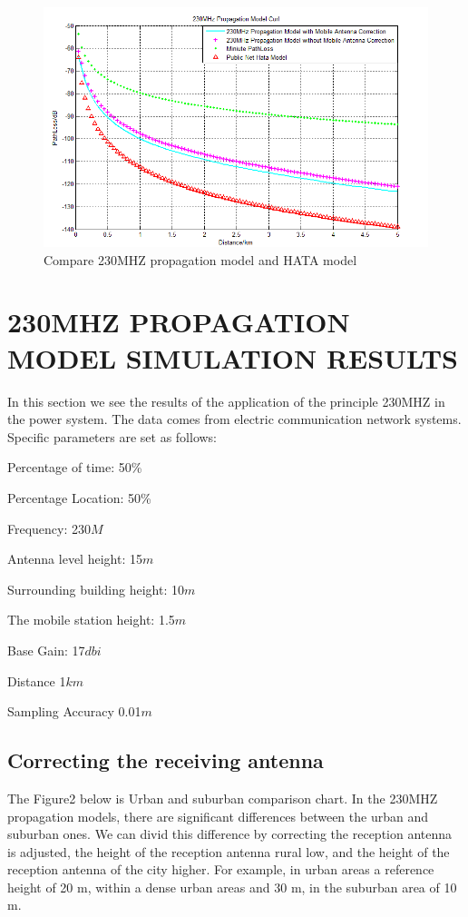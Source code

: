 \documentclass[runningheads,a4paper]{llncs}
\begin{document}
{\begin{figure}
\centerline{\includegraphics[width=15cm]{differentspace.png}}
\caption{Compare 230MHZ propagation model and HATA model }
\end{figure}

\section{230MHZ PROPAGATION MODEL SIMULATION RESULTS}

In this section we see the results of the application of the principle 230MHZ in the power system. The data comes from electric communication network systems. Specific parameters are set as follows:

Percentage of time: 50\% 

Percentage Location: 50\% 

Frequency: 230$M$ 

Antenna level height: 15$m$ 

Surrounding building height: 10$m$ 

The mobile station height: 1.5$m$ 

Base Gain: 17$dbi$ 

Distance 1$km$ 

Sampling Accuracy 0.01$m$

\subsection{Correcting the receiving antenna}

The Figure2 below is Urban and suburban comparison chart. In the 230MHZ propagation models, there are significant differences between the urban and suburban ones.  We can divid this difference by correcting the reception antenna is adjusted, the height of the reception antenna rural low, and the height of the reception antenna of the city higher. For example, in urban areas a reference height of 20 m, within a dense urban areas and 30 m, in the suburban area of 10 m.

}
\end{document}
